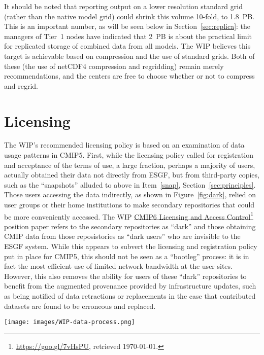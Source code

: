 \documentclass[gmd,manuscript]{copernicus}
\newcommand{\pllabel}[1]{\label{p-#1}\linelabel{l-#1}}
\newcommand{\urlref}[2] {\href{#1}{#2}\footnote{\url{#1}, retrieved \today.}}
\begin{document}
It should be noted that reporting output on a lower
resolution standard grid (rather than the native model grid) could
shrink this volume 10-fold, to 1.8~PB. This is an important number, as
will be seen below in Section~\ref{sec:replica}: the managers of Tier~1 nodes
have indicated that 2~PB is about the practical limit for replicated
storage of combined data from all models. The WIP believes
this target is achievable based on compression and the use of standard
grids. Both of these (the use of netCDF4 compression and regridding)
remain merely recommendations, and the centers are free to choose
whether or not to compress and regrid.

\section{Licensing}
\label{sec:licensing}

The WIP's recommended licensing policy is based on an examination of
data usage patterns in CMIP5. First, while the licensing policy called
for registration and acceptance of the terms of use, a large fraction,
perhaps a majority of users, actually obtained their data not directly
from ESGF, but from
\pllabel{RC1-33}
third-party copies, such as the ``snapshots'' alluded to above in
Item~\ref{snap}, Section~\ref{sec:principles}. Those users accessing
the data indirectly, as shown in Figure~\ref{fig:dark}, relied on user
groups or their home institutions to make secondary repositories that
could be more conveniently accessed. The WIP
\urlref{https://goo.gl/7vHsPU}{CMIP6 Licensing and Access Control}
position paper refers to the secondary repositories as ``dark'' and
those obtaining CMIP data from those reposistories as ``dark users''
who are invisible to the ESGF system. While this appears to subvert
the licensing and registration policy put in place for CMIP5, this
should not be seen as a ``bootleg'' process: it is in fact the most
efficient use of limited network bandwidth at the user sites. However,
this also removes the ability for users of these ``dark'' repositories
to benefit from the augmented provenance provided by infrastructure
updates, such as being notified of data retractions or replacements in
the case that contributed datasets are found to be erroneous and
replaced.

\begin{figure*}
  \begin{center}
    \texttt{[image: images/WIP-data-process.png]}
  \end{center}
  \caption{Typical data access pattern in CMIP5 involved users making
    local copies, and user groups making institutional-scale caches
    from ESGF. Figure courtesy Stephan Kindermann, DKRZ, adapted from
    WIP Licensing White Paper.}
  \label{fig:dark}
\end{figure*}
\end{document}

